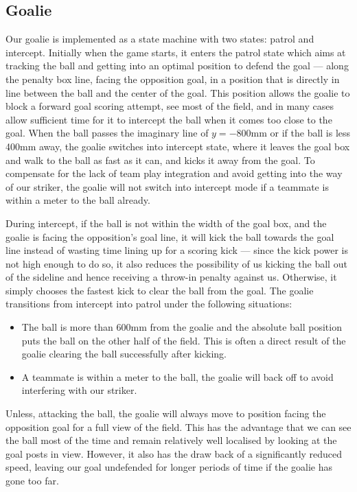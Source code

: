 \documentclass[pdftex,11pt,a4paper]{report}
\begin{document}
\subsection{Goalie}

Our goalie is implemented as a state machine with two states: patrol and intercept. Initially when the game starts, it enters the patrol state which aims at tracking the ball and getting into an optimal position to defend the goal --- along the penalty box line, facing the opposition goal, in a position that is directly in line between the ball and the center of the goal. This position allows the goalie to block a forward goal scoring attempt, see most of the field, and in many cases allow sufficient time for it to intercept the ball when it comes too close to the goal. When the ball passes the imaginary line of $y = -$800mm or if the ball is less 400mm away, the goalie switches into intercept state, where it leaves the goal box and walk to the ball as fast as it can, and kicks it away from the goal. To compensate for the lack of team play integration and avoid getting into the way of our striker, the goalie will not switch into intercept mode if a teammate is within a meter to the ball already.

During intercept, if the ball is not within the width of the goal box, and the goalie is facing the opposition's goal line, it will kick the ball towards the goal line instead of wasting time lining up for a scoring kick --- since the kick power is not high enough to do so, it also reduces the possibility of us kicking the ball out of the sideline and hence receiving a throw-in penalty against us. Otherwise, it simply chooses the fastest kick to clear the ball from the goal. The goalie transitions from intercept into patrol under the following situations:
\begin{itemize}
  \item The ball is more than 600mm from the goalie and the absolute ball position puts the ball on the other half of the field. This is often a direct result of the goalie clearing the ball successfully after kicking.
  \item A teammate is within a meter to the ball, the goalie will back off to avoid interfering with our striker. 
\end{itemize}

Unless, attacking the ball, the goalie will always move to position facing the opposition goal for a full view of the field. This has the advantage that we can see the ball most of the time and remain relatively well localised by looking at the goal posts in view. However, it also has the draw back of a significantly reduced speed, leaving our goal undefended for longer periods of time if the goalie has gone too far.
\end{document}

